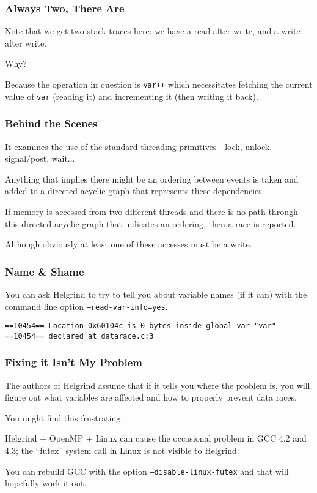 \begin{frame}
\frametitle{Always Two, There Are}


Note that we get two stack traces here: we have a read after write, and a write after write. 

Why? 

Because the operation in question is \texttt{var++} which necessitates fetching the current value of \texttt{var} (reading it) and incrementing it (then writing it back).

\end{frame}

\begin{frame}
\frametitle{Behind the Scenes}

It examines the use of the standard threading primitives - lock, unlock, signal/post, wait... 

Anything that implies there might be an ordering between events is taken and added to a directed acyclic graph that represents these dependencies. 

If memory is accessed from two different threads and there is no path through this directed acyclic graph that indicates an ordering, then a race is reported. 

Although obviously at least one of these accesses must be a write.

\end{frame}

\begin{frame}[fragile]
\frametitle{Name \& Shame}

You can ask Helgrind to try to tell you about variable names (if it can) with the command line option \texttt{--read-var-info=yes}.

\begin{verbatim}
==10454== Location 0x60104c is 0 bytes inside global var "var"
==10454== declared at datarace.c:3
\end{verbatim}

\end{frame}

\begin{frame}
\frametitle{Fixing it Isn't My Problem}


The authors of Helgrind assume that if it tells you where the problem is, you will figure out what variables are affected and how to properly prevent data races. 

You might find this frustrating. 


Helgrind + OpenMP + Linux can cause the occasional problem in GCC 4.2 and 4.3; the ``futex'' system call in Linux is not visible to Helgrind. 

You can rebuild GCC with the option \texttt{--disable-linux-futex} and that will hopefully work it out.


\end{frame}

